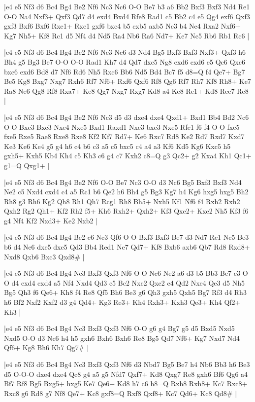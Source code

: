 \whitename{}
\blackname{}
\makegametitle
|e4 e5 Nf3 d6 Bc4 Bg4 Be2 Nf6 Nc3 Nc6 O-O Be7 b3 a6 Bb2 Bxf3 Bxf3 Nd4 Re1 O-O Na4 Nxf3+ Qxf3 Qd7 d4 exd4 Bxd4 Rfe8 Rad1 c5 Bb2 c4 e5 Qg4 exf6 Qxf3 gxf3 Bxf6 Bxf6 Rxe1+ Rxe1 gxf6 bxc4 b5 cxb5 axb5 Nc3 b4 Ne4 Rxa2 Nxf6+ Kg7 Nh5+ Kf8 Rc1 d5 Nf4 d4 Nd5 Ra4 Nb6 Ra6 Nd7+ Ke7 Nc5 Rb6 Rb1 Rc6  |

\whitename{}
\blackname{}
\makegametitle
|e4 e5 Nf3 d6 Bc4 Bg4 Be2 Nf6 Nc3 Nc6 d3 Nd4 Bg5 Bxf3 Bxf3 Nxf3+ Qxf3 h6 Bh4 g5 Bg3 Be7 O-O O-O Rad1 Kh7 d4 Qd7 dxe5 Ng8 exd6 cxd6 e5 Qc6 Qxc6 bxc6 exd6 Bd8 d7 Nf6 Rd6 Nh5 Rxc6 Bb6 Nd5 Bd4 Bc7 f5 d8=Q f4 Qe7+ Bg7 Be5 Kg8 Bxg7 Nxg7 Rxh6 Rf7 Nf6+ Rxf6 Qxf6 Rf8 Qg6 Rf7 Rh7 Kf8 Rh8+ Ke7 Ra8 Ne6 Qg8 Rf8 Rxa7+ Ke8 Qg7 Nxg7 Rxg7 Kd8 a4 Ke8 Re1+ Kd8 Ree7 Re8  |

\whitename{}
\blackname{}
\makegametitle
|e4 e5 Nf3 d6 Bc4 Bg4 Be2 Nf6 Nc3 d5 d3 dxe4 dxe4 Qxd1+ Bxd1 Bb4 Bd2 Nc6 O-O Bxc3 Bxc3 Nxe4 Nxe5 Bxd1 Raxd1 Nxc3 bxc3 Nxe5 Rfe1 f6 f4 O-O fxe5 fxe5 Rxe5 Rae8 Rxe8 Rxe8 Kf2 Kf7 Rd7+ Ke6 Rxc7 Rd8 Ke2 Rd7 Rxd7 Kxd7 Ke3 Ke6 Ke4 g5 g4 h6 c4 b6 c3 a5 c5 bxc5 c4 a4 a3 Kf6 Kd5 Kg6 Kxc5 h5 gxh5+ Kxh5 Kb4 Kh4 c5 Kh3 c6 g4 c7 Kxh2 c8=Q g3 Qc2+ g2 Kxa4 Kh1 Qc1+ g1=Q Qxg1+  |

\whitename{}
\blackname{}
\makegametitle
|e4 e5 Nf3 d6 Bc4 Bg4 Be2 Nf6 O-O Be7 Nc3 O-O d3 Nc6 Bg5 Bxf3 Bxf3 Nd4 Ne2 c5 Nxd4 cxd4 c4 a5 Rc1 b6 Qe2 h6 Bh4 g5 Bg3 Kg7 h4 Kg6 hxg5 hxg5 Bh2 Rh8 g3 Rh6 Kg2 Qh8 Rh1 Qh7 Rcg1 Rh8 Bh5+ Nxh5 Kf1 Nf6 f4 Rxh2 Rxh2 Qxh2 Rg2 Qh1+ Kf2 Rh2 f5+ Kh6 Rxh2+ Qxh2+ Kf3 Qxe2+ Kxe2 Nh5 Kf3 f6 g4 Nf4 Kf2 Nxd3+ Ke2 Nxb2  |

\whitename{}
\blackname{}
\makegametitle
|e4 e5 Nf3 d6 Bc4 Bg4 Be2 c6 Nc3 Qf6 O-O Bxf3 Bxf3 Be7 d3 Nd7 Re1 Nc5 Be3 b6 d4 Ne6 dxe5 dxe5 Qd3 Bb4 Red1 Ne7 Qd7+ Kf8 Bxb6 axb6 Qb7 Rd8 Rxd8+ Nxd8 Qxb6 Bxc3 Qxd8\#  |

\whitename{}
\blackname{}
\makegametitle
|e4 e5 Nf3 d6 Bc4 Bg4 Nc3 Bxf3 Qxf3 Nf6 O-O Nc6 Ne2 a6 d3 b5 Bb3 Be7 c3 O-O d4 exd4 cxd4 a5 Nf4 Nxd4 Qd3 c5 Bc2 Nxc2 Qxc2 c4 Qd2 Nxe4 Qe3 d5 Nh5 Bg5 Qh3 f6 Qe6+ Kh8 f4 Re8 Qf5 Bh6 Be3 g6 Qh3 gxh5 Qxh5 Bg7 Rf3 d4 Rh3 h6 Bf2 Nxf2 Kxf2 d3 g4 Qd4+ Kg3 Re3+ Kh4 Rxh3+ Kxh3 Qe3+ Kh4 Qf2+ Kh3  |

\whitename{}
\blackname{}
\makegametitle
|e4 e5 Nf3 d6 Bc4 Bg4 Nc3 Bxf3 Qxf3 Nf6 O-O g6 g4 Bg7 g5 d5 Bxd5 Nxd5 Nxd5 O-O d3 Nc6 h4 h5 gxh6 Bxh6 Bxh6 Re8 Bg5 Qd7 Nf6+ Kg7 Nxd7 Nd4 Qf6+ Kg8 Bh6 Kh7 Qg7\#  |

\whitename{}
\blackname{}
\makegametitle
|e4 e5 Nf3 d6 Bc4 Bg4 Nc3 Bxf3 Qxf3 Nf6 d3 Nbd7 Bg5 Be7 h4 Nb6 Bb3 h6 Be3 d5 O-O-O dxe4 dxe4 Qc8 g4 a5 g5 Nfd7 Qxf7+ Kd8 Qxg7 Re8 gxh6 Bf6 Qg6 a4 Bf7 Rf8 Bg5 Bxg5+ hxg5 Ke7 Qe6+ Kd8 h7 c6 h8=Q Rxh8 Rxh8+ Kc7 Rxc8+ Rxc8 g6 Rd8 g7 Nf8 Qe7+ Kc8 gxf8=Q Rxf8 Qxf8+ Kc7 Qd6+ Kc8 Qd8\#  |

